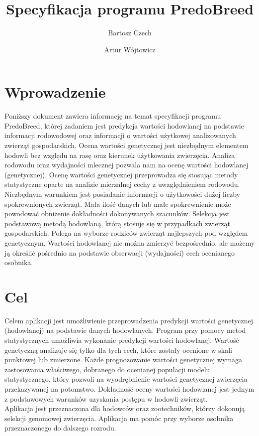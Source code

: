\documentclass{article}
\title{Specyfikacja programu PredoBreed}
\author[1]{Bartosz Czech}
\author[1]{Artur Wójtowicz}
\affil[1]{Bioinformatyka, specjalizacja: biostatystyka i programowanie bioinformatyczne}
\date{}                     %
\begin{document}
  \maketitle
\section{Wprowadzenie}
Poniższy dokument zawiera informację na temat specyfikacji programu PredoBreed, której zadaniem jest predykcja wartości hodowlanej na podstawie informacji rodowodowej oraz informacji o wartości użytkowej analizowanych zwierząt gospodarskich. Ocena wartości genetycznej jest niezbędnym elementem hodowli bez względu na rasę oraz kierunek użytkowania zwierzęcia. Analiza rodowodu oraz wydajności mlecznej pozwala nam na ocenę wartości hodowlanej (genetycznej). Ocenę wartości genetycznej przeprowadza się stosując metody statystyczne oparte na analizie mierzalnej cechy z uwzględnieniem rodowodu. Niezbędnym warunkiem jest posiadanie informacji o użytkowości dużej liczby spokrewnionych zwierząt. Mała ilość danych lub małe spokrewnienie może powodować obniżenie dokładności dokonywanych szacunków. Selekcja jest podstawową metodą hodowlaną, którą stosuje się w przypadkach zwierząt gospodarskich. Polega na wyborze rodziców zwierząt najlepszych pod względem genetycznym. Wartości hodowlanej nie można zmierzyć bezpośrednio, ale możemy ją określić pośrednio na podstawie obserwacji (wydajności) cech ocenianego osobnika.

\section{Cel}
Celem aplikacji jest umożliwienie przeprowadzenia predykcji wartości genetycznej (hodowlanej) na podstawie danych hodowlanych. Program przy pomocy metod statystycznych umożliwia wykonanie predykcji wartości hodowlanej. Wartość genetyczną analizuje się tylko dla tych cech, które zostały ocenione w skali punktowej lub zmierzone. Każde prognozowanie wartości genetycznej wymaga zastosowania właściwego, dobranego do ocenianej populacji modelu statystycznego, który pozwoli na wyodrębnienie wartości genetycznej zwierzęcia przekazywanej na potomstwo. Dokładność oceny wartości hodowlanej jest jednym z podstawowych warunków uzyskania postępu w hodowli zwierząt.\\
\indent Aplikacja jest przeznaczona dla hodowców oraz zootechników, którzy dokonują selekcji genomowej zwierzęcia. Aplikacja ma pomóc przy wyborze osobnika przeznaczonego do dalszego rozrodu.
\end{document}
